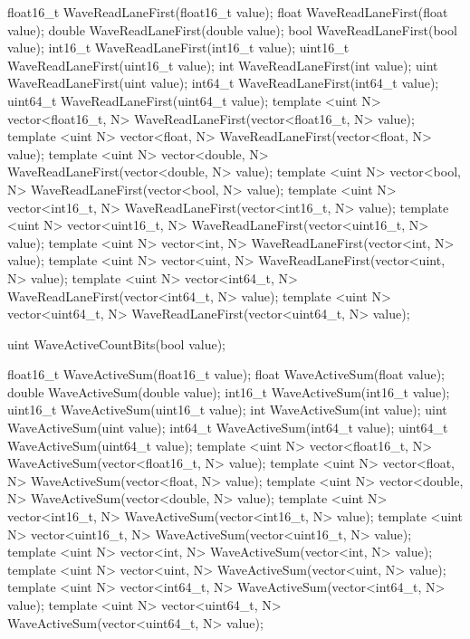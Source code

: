 \begin{HLSL}
float16_t WaveReadLaneFirst(float16_t value);
float WaveReadLaneFirst(float value);
double WaveReadLaneFirst(double value);
bool WaveReadLaneFirst(bool value);
int16_t WaveReadLaneFirst(int16_t value);
uint16_t WaveReadLaneFirst(uint16_t value);
int WaveReadLaneFirst(int value);
uint WaveReadLaneFirst(uint value);
int64_t WaveReadLaneFirst(int64_t value);
uint64_t WaveReadLaneFirst(uint64_t value);
template <uint N> vector<float16_t, N> WaveReadLaneFirst(vector<float16_t, N> value);
template <uint N> vector<float, N> WaveReadLaneFirst(vector<float, N> value);
template <uint N> vector<double, N> WaveReadLaneFirst(vector<double, N> value);
template <uint N> vector<bool, N> WaveReadLaneFirst(vector<bool, N> value);
template <uint N> vector<int16_t, N> WaveReadLaneFirst(vector<int16_t, N> value);
template <uint N> vector<uint16_t, N> WaveReadLaneFirst(vector<uint16_t, N> value);
template <uint N> vector<int, N> WaveReadLaneFirst(vector<int, N> value);
template <uint N> vector<uint, N> WaveReadLaneFirst(vector<uint, N> value);
template <uint N> vector<int64_t, N> WaveReadLaneFirst(vector<int64_t, N> value);
template <uint N> vector<uint64_t, N> WaveReadLaneFirst(vector<uint64_t, N> value);

uint WaveActiveCountBits(bool value);

float16_t WaveActiveSum(float16_t value);
float WaveActiveSum(float value);
double WaveActiveSum(double value);
int16_t WaveActiveSum(int16_t value);
uint16_t WaveActiveSum(uint16_t value);
int WaveActiveSum(int value);
uint WaveActiveSum(uint value);
int64_t WaveActiveSum(int64_t value);
uint64_t WaveActiveSum(uint64_t value);
template <uint N> vector<float16_t, N> WaveActiveSum(vector<float16_t, N> value);
template <uint N> vector<float, N> WaveActiveSum(vector<float, N> value);
template <uint N> vector<double, N> WaveActiveSum(vector<double, N> value);
template <uint N> vector<int16_t, N> WaveActiveSum(vector<int16_t, N> value);
template <uint N> vector<uint16_t, N> WaveActiveSum(vector<uint16_t, N> value);
template <uint N> vector<int, N> WaveActiveSum(vector<int, N> value);
template <uint N> vector<uint, N> WaveActiveSum(vector<uint, N> value);
template <uint N> vector<int64_t, N> WaveActiveSum(vector<int64_t, N> value);
template <uint N> vector<uint64_t, N> WaveActiveSum(vector<uint64_t, N> value);


\end{HLSL}
